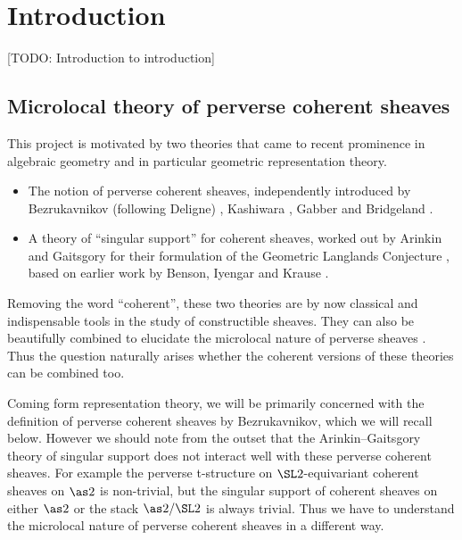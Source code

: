 \chapter{Introduction}

[TODO: Introduction to introduction]

\section{Microlocal theory of perverse coherent sheaves}

This project is motivated by two theories that came to recent prominence in algebraic geometry and in particular geometric representation theory.
\begin{itemize}
    \item The notion of perverse coherent sheaves, independently introduced by Bezrukavnikov (following Deligne) \cite{ArinkinBezrukavnikov:2010:PerverseCoherentSheaves}, Kashiwara \cite{Kashiwara:2004:tStructureOnHolonomicDModuleCoherentOModules}, Gabber \cite{Gabber:2004:NotesOnSomeTStructures} and Bridgeland \cite{Bridgeland:2006:DerivedCategoriesOfCoherentSheaves}.
    \item A theory of \enquote{singular support} for coherent sheaves, worked out by Arinkin and Gaitsgory for their formulation of the Geometric Langlands Conjecture \cite{ArinkinGaitsgory:2015:SingularSupport}, based on earlier work by Benson, Iyengar and Krause \cite{BensonIyengarKrause:2008:LocalCohomologyAndSupportForTriangulatedCategories}.
\end{itemize}
Removing the word \enquote{coherent}, these two theories are by now classical and indispensable tools in the study of constructible sheaves.
They can also be beautifully combined to elucidate the microlocal nature of perverse sheaves \cite{KashiwaraSchapira:1994:SheavesOnManifolds}.
Thus the question naturally arises whether the coherent versions of these theories can be combined too.

Coming form representation theory, we will be primarily concerned with the definition of perverse coherent sheaves by Bezrukavnikov, which we will recall below.
However we should note from the outset that the Arinkin--Gaitsgory theory of singular support does not interact well with these perverse coherent sheaves.
For example the perverse t-structure on $\SL2$-equivariant coherent sheaves on $\as2$ is non-trivial, but the singular support of coherent sheaves on either $\as2$ or the stack $\as2/\SL2$ is always trivial.
Thus we have to understand the microlocal nature of perverse coherent sheaves in a different way.

